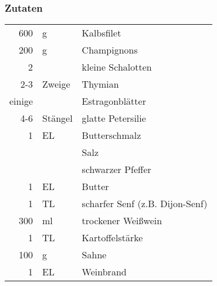 \subsubsection*{Zutaten}
\begin{tabular}{rll}
	600    & g       & Kalbsfilet                      \\
	200    & g       & Champignons                     \\
	2      &         & kleine Schalotten               \\
	2-3    & Zweige  & Thymian                         \\
	einige &         & Estragonblätter                 \\
	4-6    & Stängel & glatte Petersilie               \\
	1      & EL      & Butterschmalz                   \\
	&         & Salz                            \\
	&         & schwarzer Pfeffer               \\
	1      & EL      & Butter                          \\
	1      & TL      & scharfer Senf (z.B. Dijon-Senf) \\
	300    & ml      & trockener Weißwein              \\
	1      & TL      & Kartoffelstärke                 \\
	100    & g       & Sahne                           \\
	1      & EL      & Weinbrand                       \\
\end{tabular} 
